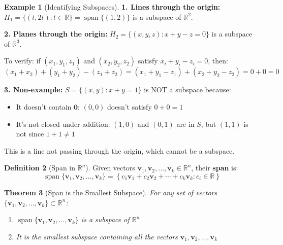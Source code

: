 \documentclass[12pt]{article}
\numberwithin{equation}{section}
\newcommand{\vect}[1]{\boldsymbol{#1}}   %
\newcommand{\Span}{\operatorname{span}}
\theoremstyle{plain}
\newtheorem{theorem}{Theorem}[section]
\theoremstyle{definition}
\newtheorem{definition}[theorem]{Definition}
\newtheorem{example}[theorem]{Example}
\theoremstyle{remark}
\begin{document}
\begin{example}[Identifying Subspaces]
\textbf{1. Lines through the origin:}
$H_1 = \{(t, 2t) : t \in \mathbb{R}\} = \Span\{(1, 2)\}$ is a subspace of $\mathbb{R}^2$.

\textbf{2. Planes through the origin:}
$H_2 = \{(x, y, z) : x + y - z = 0\}$ is a subspace of $\mathbb{R}^3$.

To verify: if $(x_1, y_1, z_1)$ and $(x_2, y_2, z_2)$ satisfy $x_i + y_i - z_i = 0$, then:
$$(x_1 + x_2) + (y_1 + y_2) - (z_1 + z_2) = (x_1 + y_1 - z_1) + (x_2 + y_2 - z_2) = 0 + 0 = 0$$

\textbf{3. Non-example:}
$S = \{(x, y) : x + y = 1\}$ is NOT a subspace because:
\begin{itemize}
\item It doesn't contain $\vect{0}$: $(0, 0)$ doesn't satisfy $0 + 0 = 1$
\item It's not closed under addition: $(1, 0)$ and $(0, 1)$ are in $S$, but $(1, 1)$ is not since $1 + 1 \neq 1$
\end{itemize}

This is a line not passing through the origin, which cannot be a subspace.
\end{example}

\begin{definition}[Span in $\mathbb{R}^n$]
Given vectors $\vect{v}_1, \vect{v}_2, \ldots, \vect{v}_k \in \mathbb{R}^n$, their \textbf{span} is:
$$\Span\{\vect{v}_1, \vect{v}_2, \ldots, \vect{v}_k\} = \left\{c_1\vect{v}_1 + c_2\vect{v}_2 + \cdots + c_k\vect{v}_k : c_i \in \mathbb{R}\right\}$$
\end{definition}

\begin{theorem}[Span is the Smallest Subspace]
For any set of vectors $\{\vect{v}_1, \vect{v}_2, \ldots, \vect{v}_k\} \subset \mathbb{R}^n$:
\begin{enumerate}
\item $\Span\{\vect{v}_1, \vect{v}_2, \ldots, \vect{v}_k\}$ is a subspace of $\mathbb{R}^n$
\item It is the smallest subspace containing all the vectors $\vect{v}_1, \vect{v}_2, \ldots, \vect{v}_k$
\end{enumerate}
\end{theorem}
\end{document}
